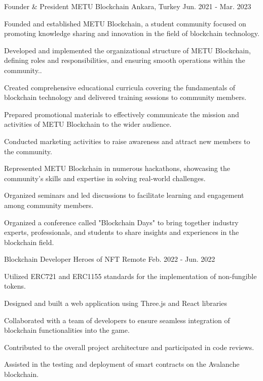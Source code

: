 \begin{cventries}
  \cventry
    {Founder \& President} %
    {METU Blockchain} %
    {Ankara, Turkey} %
    {Jun. 2021 - Mar. 2023} %
    {
      \begin{cvitems} %
            \item {Founded and established METU Blockchain, a student community focused on promoting knowledge sharing and innovation in the field of blockchain technology.}
            \item {Developed and implemented the organizational structure of METU Blockchain, defining roles and responsibilities, and ensuring smooth operations within the community..}
            \item {Created comprehensive educational curricula covering the fundamentals of blockchain technology and delivered training sessions to community members.}
            \item {Prepared promotional materials to effectively communicate the mission and activities of METU Blockchain to the wider audience.}
            \item {Conducted marketing activities to raise awareness and attract new members to the community.}
            \item {Represented METU Blockchain in numerous hackathons, showcasing the community's skills and expertise in solving real-world challenges.}
            \item {Organized seminars and led discussions to facilitate learning and engagement among community members.}
            \item {Organized a conference called "Blockchain Days" to bring together industry experts, professionals, and students to share insights and experiences in the blockchain field.}        
      \end{cvitems}
    }

  \cventry
    {Blockchain Developer} %
    {Heroes of NFT} %
    {Remote} %
    {Feb. 2022 - Jun. 2022} %
    {
      \begin{cvitems} %
        \item {Utilized ERC721 and ERC1155 standards for the implementation of non-fungible tokens.}
        \item {Designed and built a web application using Three.js and React libraries}
        \item {Collaborated with a team of developers to ensure seamless integration of blockchain functionalities into the game.}
        \item {Contributed to the overall project architecture and participated in code reviews.}
        \item {Assisted in the testing and deployment of smart contracts on the Avalanche blockchain.}
      \end{cvitems}
    }

\end{cventries}
